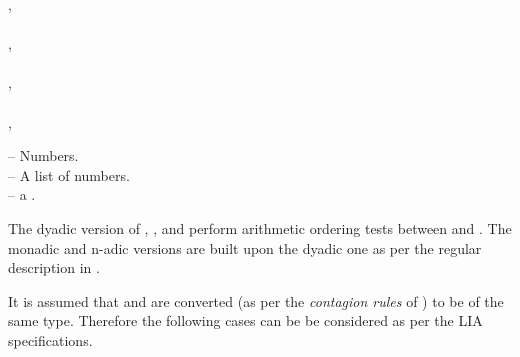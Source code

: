 \documentclass[../Comparisons-Predicates.tex]{subfiles}
\begin{document}
  \index{*!\code{<}}
  \index{*!\code{<=}}
  \index{*!\code{>}}
  \index{*!\code{>=}}
  
  \DSyntax{}
  
  \code{<} ,  \RArrow {}\\
  \code{<}    \RArrow {}\\
  \code{<=} ,  \RArrow {}\\
  \code{<=}    \RArrow {}\\
  \code{>} ,  \RArrow {}\\
  \code{>}    \RArrow {}\\
  \code{>=} ,  \RArrow {}\\
  \code{>=}    \RArrow {}
  
  \DArgsNValues{}
  
    -- Numbers.\\
   -- A list of numbers.\\
   -- a .
  
  \DDescription{}
  
  The dyadic version of \code{<}, \code{<=}, \code{>} and \code{>=}
  perform arithmetic ordering tests between  and
  .  The monadic and n-adic versions are built upon the
  dyadic one as per the regular \CL{} description in
  \cite{1996:ANSIHyperSpec}.
  
  It is assumed that  and  are converted (as per
  the \emph{contagion rules} of \CL{}) to be of the same type.
  Therefore the following cases can be be considered as per the LIA
  specifications.
  
\end{document}
